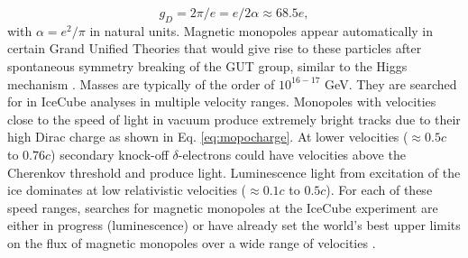 \begin{equation}
\label{eq:mopocharge}
g_D = 2\pi/e = e/2\alpha \approx 68.5e,
\end{equation}
with $\alpha = e^2/\pi$ in natural units. Magnetic monopoles appear automatically in certain Grand Unified Theories that would give rise to these particles after spontaneous symmetry breaking of the GUT group, similar to the Higgs mechanism \cite{HOOFT1974276,Polyakov:1974ek}. Masses are typically of the order of $10^{16-17}$ GeV. They are searched for in IceCube analyses in multiple velocity ranges. Monopoles with velocities close to the speed of light in vacuum produce extremely bright tracks due to their high Dirac charge as shown in Eq. \ref{eq:mopocharge}. At lower velocities ($\approx 0.5c$ to $0.76c$) secondary knock-off $\delta$-electrons could have velocities above the Cherenkov threshold and produce light. Luminescence light from excitation of the ice dominates at low relativistic velocities ($\approx 0.1c$ to $0.5c$). For each of these speed ranges, searches for magnetic monopoles at the IceCube experiment are either in progress (luminescence) or have already set the world's best upper limits on the flux of magnetic monopoles over a wide range of velocities \cite{Aartsen:2014awd}.


















